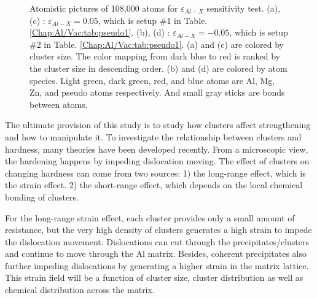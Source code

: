 \begin{figure}[!ht]
\caption[Atomistic pictures of 108,000 atoms for $\varepsilon_{Al-X}$ sensitivity test.]{Atomistic pictures of 108,000 atoms for $\varepsilon_{Al-X}$ sensitivity test. (a), (c) : $\varepsilon_{Al-X} = 0.05$, which is setup \#1 in Table. \ref{Chap:Al/Vac:tab:pseudo1}. (b), (d) : $\varepsilon_{Al-X} = -0.05$, which is setup \#2 in Table. \ref{Chap:Al/Vac:tab:pseudo1}. (a) and (c) are colored by cluster size. The color mapping from dark blue to red is ranked by the cluster size in descending order. (b) and (d) are colored by atom species. Light green, dark green, red, and blue atoms are Al, Mg, Zn, and pseudo atoms respectively. And small gray sticks are bonds between atoms.}
\label{Chap:Al/Vac:fig:sens_Al}
\end{figure}
\endgroup

The ultimate provision of this study is to study how clusters affect strengthening and how to manipulate it. To investigate the relationship between clusters and hardness, many theories have been developed recently. \cite{yasi2010first, starink2009thermodynamics, curtin2006predictive} From a microscopic view, the hardening happens by impeding dislocation moving. The effect of clusters on changing hardness can come from two sources: 1) the long-range effect, which is the strain effect. 2) the short-range effect, which depends on the local chemical bonding of clusters.

For the long-range strain effect, each cluster provides only a small amount of resistance, but the very high density of clusters generates a high strain to impede the dislocation movement. Dislocations can cut through the precipitates/clusters and continue to move through the Al matrix. Besides, coherent precipitates also further impeding dislocations by generating a higher strain in the matrix lattice. This strain field will be a function of cluster size, cluster distribution as well as chemical distribution across the matrix.


